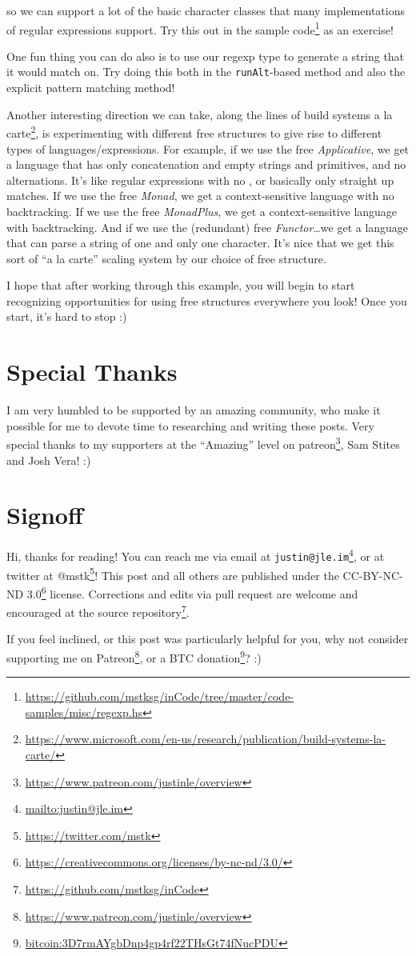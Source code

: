 \documentclass[]{article}
\renewcommand{\href}[2]{#2\footnote{\url{#1}}}
\begin{document}
so we can support a lot of the basic character classes that many implementations
of regular expressions support. Try this out in the
\href{https://github.com/mstksg/inCode/tree/master/code-samples/misc/regexp.hs}{sample
code} as an exercise!

One fun thing you can do also is to use our regexp type to generate a string
that it would match on. Try doing this both in the \texttt{runAlt}-based method
and also the explicit pattern matching method!

Another interesting direction we can take, along the lines of
\href{https://www.microsoft.com/en-us/research/publication/build-systems-la-carte/}{build
systems a la carte}, is experimenting with different free structures to give
rise to different types of languages/expressions. For example, if we use the
free \emph{Applicative}, we get a language that has only concatenation and empty
strings and primitives, and no alternations. It's like regular expressions with
no \texttt{\textbar{}}, or basically only straight up matches. If we use the
free \emph{Monad}, we get a context-sensitive language with no backtracking. If
we use the free \emph{MonadPlus}, we get a context-sensitive language with
backtracking. And if we use the (redundant) free \emph{Functor}\ldots we get a
language that can parse a string of one and only one character. It's nice that
we get this sort of ``a la carte'' scaling system by our choice of free
structure.

I hope that after working through this example, you will begin to start
recognizing opportunities for using free structures everywhere you look! Once
you start, it's hard to stop :)

\hypertarget{special-thanks}{%
\section{Special Thanks}\label{special-thanks}}

I am very humbled to be supported by an amazing community, who make it possible
for me to devote time to researching and writing these posts. Very special
thanks to my supporters at the ``Amazing'' level on
\href{https://www.patreon.com/justinle/overview}{patreon}, Sam Stites and Josh
Vera! :)

\hypertarget{signoff}{%
\section{Signoff}\label{signoff}}

Hi, thanks for reading! You can reach me via email at
\href{mailto:justin@jle.im}{\nolinkurl{justin@jle.im}}, or at twitter at
\href{https://twitter.com/mstk}{@mstk}! This post and all others are published
under the \href{https://creativecommons.org/licenses/by-nc-nd/3.0/}{CC-BY-NC-ND
3.0} license. Corrections and edits via pull request are welcome and encouraged
at \href{https://github.com/mstksg/inCode}{the source repository}.

If you feel inclined, or this post was particularly helpful for you, why not
consider \href{https://www.patreon.com/justinle/overview}{supporting me on
Patreon}, or a \href{bitcoin:3D7rmAYgbDnp4gp4rf22THsGt74fNucPDU}{BTC donation}?
:)
\end{document}
